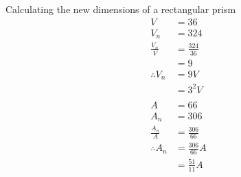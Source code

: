 \begin{wex}{Calculating the new dimensions of a rectangular prism}
{
\begin{align*}
  V &= 36 \\
  V_n &= 324 \\
  \frac{V_n}{V} &= \frac{324}{36} \\
  &= 9 \\
  \therefore V_n &= 9V \\
  &= 3^2 V \\
  \\
  A &= 66 \\
  A_n &= 306 \\
  \frac{A_n}{A} &= \frac{306}{66} \\
  \therefore A_n &= \frac{306}{66}A \\
  &= \frac{51}{11}A\\
\end{align*}
}
\end{wex}


